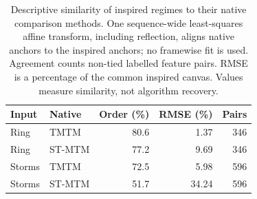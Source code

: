 \begin{table}[t]
\caption{Descriptive similarity of inspired regimes to their native comparison methods. One sequence-wide least-squares affine transform, including reflection, aligns native anchors to the inspired anchors; no framewise fit is used. Agreement counts non-tied labelled feature pairs. RMSE is a percentage of the common inspired canvas. Values measure similarity, not algorithm recovery.}\label{tab:unified_similarity}
\centering\small
\begin{tabular}{llrrr}\toprule
Input & Native & Order (\%) & RMSE (\%) & Pairs\\\midrule
Ring & TMTM & 80.6 & 1.37 & 346 \\
Ring & ST-MTM & 77.2 & 9.69 & 346 \\
Storms & TMTM & 72.5 & 5.98 & 596 \\
Storms & ST-MTM & 51.7 & 34.24 & 596 \\
\bottomrule\end{tabular}\end{table}
